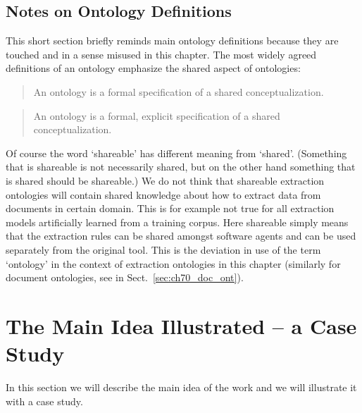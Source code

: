 \subsection{Notes on Ontology Definitions}
This short section briefly reminds main ontology definitions because they are touched and in a sense misused in this chapter. The most widely agreed definitions of an ontology emphasize the shared aspect of ontologies: 
\begin{quote}
An ontology is a formal specification of a shared conceptualization.	\citep{so17864}
\end{quote}

\begin{quote}
An ontology is a formal, explicit specification of a shared conceptualization. \citep{Studer1998161}
\end{quote}

Of course the word `shareable' has different meaning from `shared'. (Something that is shareable is not necessarily shared, but on the other hand something that is shared should be shareable.) We do not think that shareable extraction ontologies will contain shared knowledge about how to extract data from documents in certain domain. This is for example not true for all extraction models artificially learned from a training corpus. Here shareable simply means that the extraction rules can be shared amongst software agents and can be used separately from the original tool. This is the deviation in use of the term `ontology' in the context of extraction ontologies in this chapter (similarly for document ontologies, see in Sect.~\ref{sec:ch70_doc_ont}).







\section{The Main Idea Illustrated -- a Case Study} \label{sec:case}

In this section we will describe the main idea of the work and we will illustrate it with a case study.

